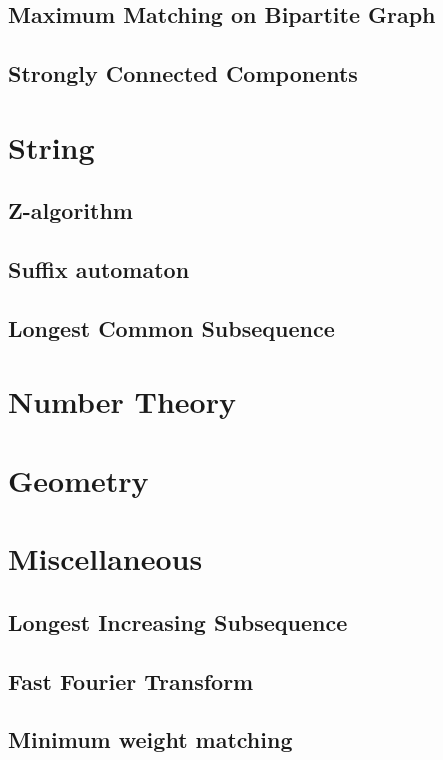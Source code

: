 \documentclass[a4paper,11pt]{article}
\begin{document}
  \subsection{Maximum Matching on Bipartite Graph}
    
  
  \subsection{Strongly Connected Components}
    

\section{String}
  \subsection{Z-algorithm}
      

  \subsection{Suffix automaton}
      
  
  \subsection{Longest Common Subsequence}
    

\section{Number Theory}
  

\section{Geometry}
  

\section{Miscellaneous}
  \subsection{Longest Increasing Subsequence}
        
    
  \subsection{Fast Fourier Transform}
        
    
  \subsection{Minimum weight matching}
    
\end{document}
